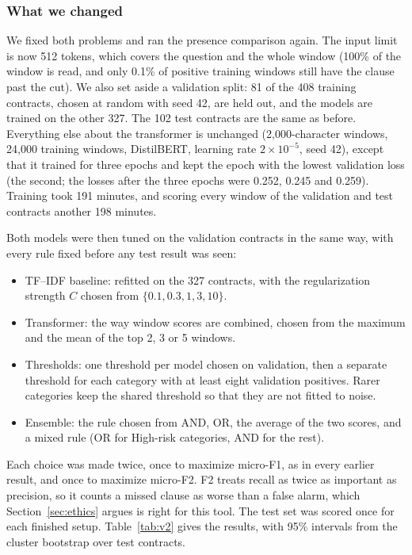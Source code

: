 \subsubsection{What we changed}
We fixed both problems and ran the presence comparison again. The input limit is now 512 tokens, which covers the question and the whole window (100\% of the window is read, and only 0.1\% of positive training windows still have the clause past the cut). We also set aside a validation split: 81 of the 408 training contracts, chosen at random with seed 42, are held out, and the models are trained on the other 327. The 102 test contracts are the same as before. Everything else about the transformer is unchanged (2{,}000-character windows, 24{,}000 training windows, DistilBERT, learning rate $2\times10^{-5}$, seed 42), except that it trained for three epochs and kept the epoch with the lowest validation loss (the second; the losses after the three epochs were 0.252, 0.245 and 0.259). Training took 191 minutes, and scoring every window of the validation and test contracts another 198 minutes.

Both models were then tuned on the validation contracts in the same way, with every rule fixed before any test result was seen:
\begin{itemize}[itemsep=2pt]
  \item TF--IDF baseline: refitted on the 327 contracts, with the regularization strength $C$ chosen from $\{0.1, 0.3, 1, 3, 10\}$.
  \item Transformer: the way window scores are combined, chosen from the maximum and the mean of the top 2, 3 or 5 windows.
  \item Thresholds: one threshold per model chosen on validation, then a separate threshold for each category with at least eight validation positives. Rarer categories keep the shared threshold so that they are not fitted to noise.
  \item Ensemble: the rule chosen from AND, OR, the average of the two scores, and a mixed rule (OR for High-risk categories, AND for the rest).
\end{itemize}
Each choice was made twice, once to maximize micro-F1, as in every earlier result, and once to maximize micro-F2. F2 treats recall as twice as important as precision, so it counts a missed clause as worse than a false alarm, which Section~\ref{sec:ethics} argues is right for this tool. The test set was scored once for each finished setup. Table~\ref{tab:v2} gives the results, with 95\% intervals from the cluster bootstrap over test contracts.

